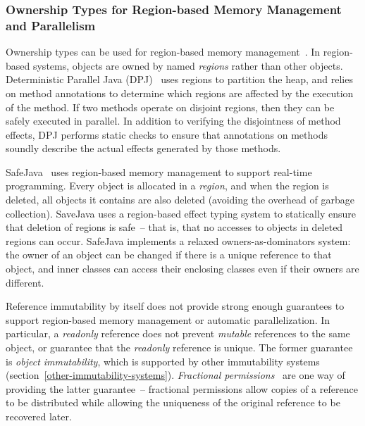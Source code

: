 \documentclass[letterpaper,11pt]{article}
\theoremstyle{definition}
\theoremstyle{remark}
\begin{document}
\subsubsection{Ownership Types for Region-based Memory Management and Parallelism}

Ownership types can be used for region-based memory management~\cite{ownership-regions}.
In region-based systems, objects are owned by named \emph{regions} rather than other objects.
Deterministic Parallel Java (DPJ)~\cite{deterministic-parallelism} uses regions to partition the heap, and
relies on method annotations to determine which regions are affected by the execution of the method.
If two methods operate on disjoint regions, then they can be safely executed in parallel.
In addition to verifying the disjointness of method effects, DPJ performs static checks
to ensure that annotations on methods soundly describe the actual effects generated by
those methods.

SafeJava~\cite{safejava} uses region-based memory management to support real-time programming.
Every object is allocated in a \emph{region}, and when the region is deleted,
all objects it contains are also deleted (avoiding the overhead of garbage collection).
SaveJava uses a region-based effect typing system to statically ensure that
deletion of regions is safe~-- that is, that no accesses to objects in deleted regions can occur.
SafeJava implements a relaxed owners-as-dominators system: the owner of an object can be changed
if there is a unique reference to that object, and inner classes can access their enclosing classes
even if their owners are different.

Reference immutability by itself does not provide strong enough guarantees
to support region-based memory management or automatic parallelization.
In particular, a \emph{readonly} reference does not prevent \emph{mutable}
references to the same object, or guarantee that the \emph{readonly} reference is unique.
The former guarantee is \emph{object immutability}, which is supported by other immutability systems
(section~\ref{other-immutability-systems}).
\emph{Fractional permissions}~\cite{fractional-permissions} are one way of providing the latter guarantee~--
fractional permissions allow copies of a reference to be distributed while allowing
the uniqueness of the original reference to be recovered later.


\begin{comment}
\subsection{Acyclic Region Type System (ARTS)}

Lu and Potter~\cite{} created the
Acyclic Region Type System (ARTS) to statically detect and prevent
unwanted cycles in object reachability graphs.

\end{comment}
\end{document}
